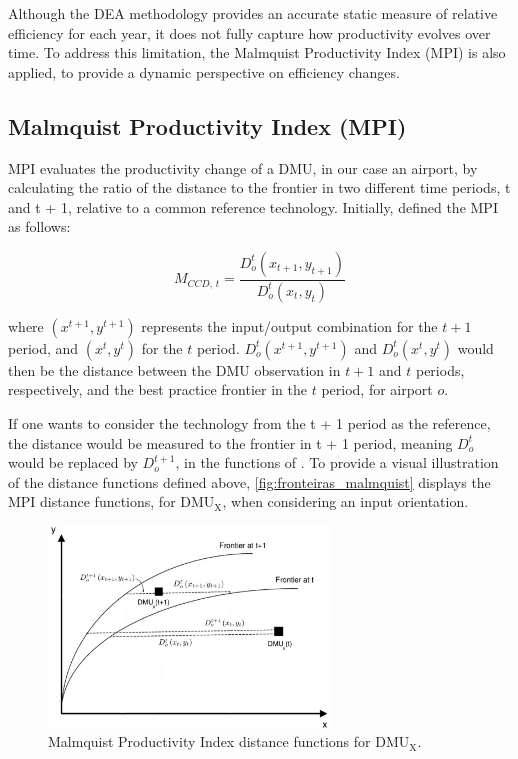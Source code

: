  Although the DEA methodology provides an accurate
static measure of relative efficiency for each year, it does not fully capture how productivity evolves over
time. To address this limitation, the Malmquist Productivity Index (MPI) is also applied, to provide a
dynamic perspective on efficiency changes.

\subsection{Malmquist Productivity Index (MPI)}
\label{mpi}


MPI evaluates the productivity change of a DMU, in our case an airport, by calculating the ratio of
the distance to the frontier in two different time periods, t and t + 1, relative to a common reference
technology. Initially, \cite{caves1982} defined the MPI as follows:

\begin{equation}   
    \label{eq:MI1} 
M_{CCD,\,t} = \frac{D^{t}_{o}\left(x_{t+1}, y_{t+1}\right)}{D^{t}_{o}\left(x_{t}, y_{t}\right)}         
\end{equation}




where $\left(x^{t+1}, y^{t+1}\right)$ represents the input/output combination for the $t+1$ period, and $\left(x^{t}, y^{t}\right)$  for the $t$ period. $D^{t}_{o}\left(x^{t+1}, y^{t+1}\right)$ and $D^{t}_{o}\left(x^{t}, y^{t}\right)$ would then be the distance between the DMU observation in $t+1$ and $t$ periods, respectively, and the best practice frontier in the $t$ period, for airport $o$. 

If one wants to consider the technology from the t + 1 period as the reference, the distance would be measured to the frontier in t + 1 period, meaning $D^{t}_{o}$ would be replaced by $D^{t+1}_{o}$, in the functions of . To provide a visual illustration of the distance functions defined above, \autoref{fig:fronteiras_malmquist} displays the MPI
distance functions, for $\text{DMU}_\text{X}$, when considering an input orientation.

\begin{figure}[H]
  \centering
  \includegraphics[width=7.5cm]{images/fronteiras_malmquist.jpg}
  \vspace{-0.5cm}
  \caption{Malmquist Productivity Index distance functions for $\text{DMU}_\text{X}$.}
  \label{fig:fronteiras_malmquist}
\end{figure}

